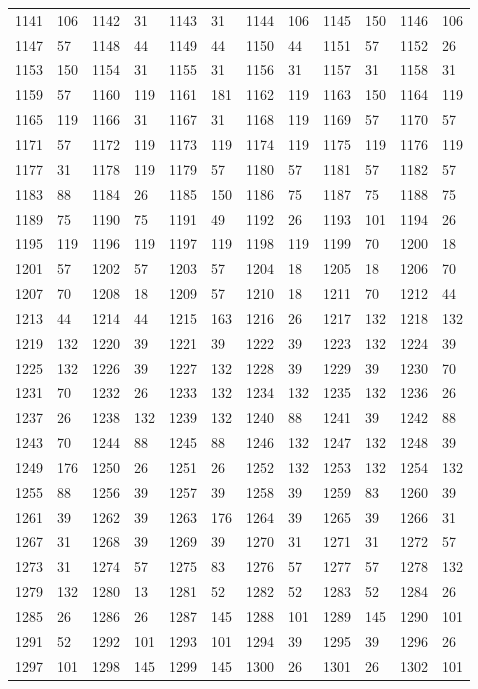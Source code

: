 \begin{longtable}{llllllllllll}
1141 & 106&1142 &31&1143& 31&1144 &106&1145 &150&1146& 106\\
1147 & 57&1148 &44&1149& 44&1150 &44&1151 &57&1152& 26\\
1153 & 150&1154 &31&1155& 31&1156 &31&1157 &31&1158& 31\\
1159 & 57&1160 &119&1161& 181&1162 &119&1163 &150&1164& 119\\
1165 & 119&1166 &31&1167& 31&1168 &119&1169 &57&1170& 57\\
1171 & 57&1172 &119&1173& 119&1174 &119&1175 &119&1176& 119\\
1177 & 31&1178 &119&1179& 57&1180 &57&1181 &57&1182& 57\\
1183 & 88&1184 &26&1185& 150&1186 &75&1187 &75&1188& 75\\
1189 & 75&1190 &75&1191& 49&1192 &26&1193 &101&1194& 26\\
1195 & 119&1196 &119&1197& 119&1198 &119&1199 &70&1200& 18\\
1201 & 57&1202 &57&1203& 57&1204 &18&1205 &18&1206& 70\\
1207 & 70&1208 &18&1209& 57&1210 &18&1211 &70&1212& 44\\
1213 & 44&1214 &44&1215& 163&1216 &26&1217 &132&1218& 132\\
1219 & 132&1220 &39&1221& 39&1222 &39&1223 &132&1224& 39\\
1225 & 132&1226 &39&1227& 132&1228 &39&1229 &39&1230& 70\\
1231 & 70&1232 &26&1233& 132&1234 &132&1235 &132&1236& 26\\
1237 & 26&1238 &132&1239& 132&1240 &88&1241 &39&1242& 88\\
1243 & 70&1244 &88&1245& 88&1246 &132&1247 &132&1248& 39\\
1249 & 176&1250 &26&1251& 26&1252 &132&1253 &132&1254& 132\\
1255 & 88&1256 &39&1257& 39&1258 &39&1259 &83&1260& 39\\
1261 & 39&1262 &39&1263& 176&1264 &39&1265 &39&1266& 31\\
1267 & 31&1268 &39&1269& 39&1270 &31&1271 &31&1272& 57\\
1273 & 31&1274 &57&1275& 83&1276 &57&1277 &57&1278& 132\\
1279 & 132&1280 &13&1281& 52&1282 &52&1283 &52&1284& 26\\
1285 & 26&1286 &26&1287& 145&1288 &101&1289 &145&1290& 101\\
1291 & 52&1292 &101&1293& 101&1294 &39&1295 &39&1296& 26\\
1297 & 101&1298 &145&1299& 145&1300 &26&1301 &26&1302& 101\\

\end{longtable}
